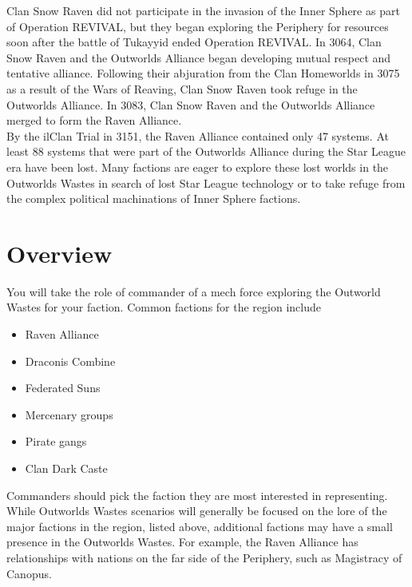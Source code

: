 \documentclass[UTF8]{article}
\begin{document}
Clan Snow Raven did not participate in the invasion of the Inner Sphere as part of Operation REVIVAL, but they began exploring the Periphery for resources soon after the battle of Tukayyid ended Operation REVIVAL.
In 3064, Clan Snow Raven and the Outworlds Alliance began developing mutual respect and tentative alliance.
Following their abjuration from the Clan Homeworlds in 3075 as a result of the Wars of Reaving, Clan Snow Raven took refuge in the Outworlds Alliance.
In 3083, Clan Snow Raven and the Outworlds Alliance merged to form the Raven Alliance.\\

By the ilClan Trial in 3151, the Raven Alliance contained only 47 systems.
At least 88 systems that were part of the Outworlds Alliance during the Star League era have been lost.
Many factions are eager to explore these lost worlds in the Outworlds Wastes in search of lost Star League technology or to take refuge from the complex political machinations of Inner Sphere factions.\\

\section{Overview}

You will take the role of commander of a mech force exploring the Outworld Wastes for your faction.
Common factions for the region include

\begin{itemize}

\item Raven Alliance

\item Draconis Combine

\item Federated Suns

\item Mercenary groups

\item Pirate gangs

\item Clan Dark Caste

\end{itemize}

Commanders should pick the faction they are most interested in representing.
While Outworlds Wastes scenarios will generally be focused on the lore of the major factions in the region, listed above, additional factions may have a small presence in the Outworlds Wastes.
For example, the Raven Alliance has relationships with nations on the far side of the Periphery, such as Magistracy of Canopus.\\
\end{document}
